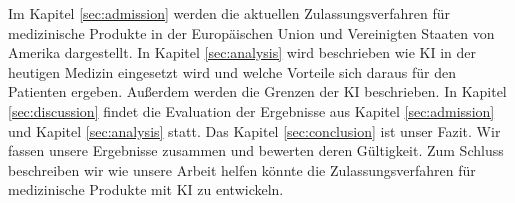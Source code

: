 Im Kapitel \ref{sec:admission} werden die aktuellen Zulassungsverfahren für medizinische Produkte in der Europäischen Union und Vereinigten Staaten von Amerika dargestellt. In Kapitel \ref{sec:analysis} wird beschrieben wie KI in der heutigen Medizin eingesetzt wird und welche Vorteile sich daraus für den Patienten ergeben. Außerdem werden die Grenzen der KI beschrieben. In Kapitel \ref{sec:discussion} findet die Evaluation der Ergebnisse aus Kapitel \ref{sec:admission} und Kapitel \ref{sec:analysis} statt. Das Kapitel \ref{sec:conclusion} ist unser Fazit. Wir fassen unsere Ergebnisse zusammen und bewerten deren Gültigkeit. Zum Schluss beschreiben wir wie unsere Arbeit helfen könnte die Zulassungsverfahren für medizinische Produkte mit KI zu entwickeln.